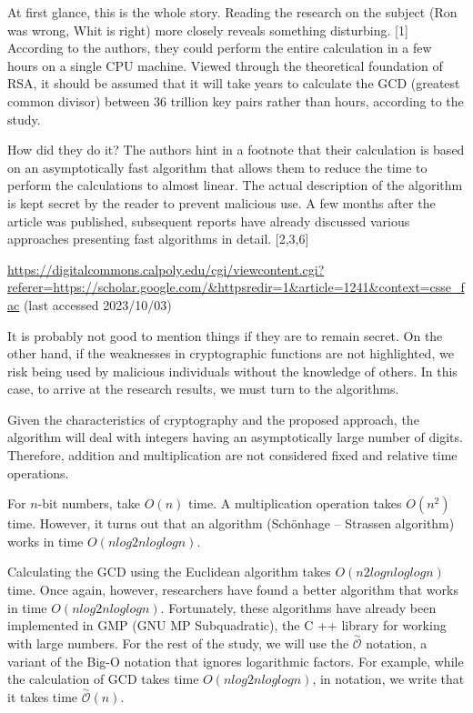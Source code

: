 \documentclass[runningheads]{llncs}
\begin{document}
At first glance, this is the whole story. Reading the research on the subject (Ron was wrong, Whit is right) more closely reveals something disturbing. [1] According to the authors, they could perform the entire calculation in a few hours on a single CPU machine. Viewed through the theoretical foundation of RSA, it should be assumed that it will take years to calculate the GCD (greatest common divisor) between 36 trillion key pairs rather than hours, according to the study.

How did they do it? The authors hint in a footnote that their calculation is based on an asymptotically fast algorithm that allows them to reduce the time to perform the calculations to almost linear. The actual description of the algorithm is kept secret by the reader to prevent malicious use. A few months after the article was published, subsequent reports have already discussed various approaches presenting fast algorithms in detail. [2,3,6] 

\url{https://digitalcommons.calpoly.edu/cgi/viewcontent.cgi?referer=https://scholar.google.com/&httpsredir=1&article=1241&context=csse_fac} (last accessed 2023/10/03)

It is probably not good to mention things if they are to remain secret. On the other hand, if the weaknesses in cryptographic functions are not highlighted, we risk being used by malicious individuals without the knowledge of others. In this case, to arrive at the research results, we must turn to the algorithms. 

Given the characteristics of cryptography and the proposed approach, the algorithm will deal with integers having an asymptotically large number of digits. Therefore, addition and multiplication are not considered fixed and relative time operations.

For $n$-bit numbers, take $O(n)$ time. A multiplication operation takes $O(n^2)$ time. However, it turns out that an algorithm (Schönhage – Strassen algorithm) works in time $O(n log 2 n log log n)$.

Calculating the GCD using the Euclidean algorithm takes $O(n2 log n log log n)$ time. Once again, however, researchers have found a better algorithm that works in time $O (n log 2 n log log n)$. Fortunately, these algorithms have already been implemented in GMP (GNU MP Subquadratic), the C ++ library for working with large numbers. For the rest of the study, we will use the $\overset{\sim}{\mathcal{O}}$ notation, a variant of the Big-O notation that ignores logarithmic factors. For example, while the calculation of GCD takes time $O (n log 2 n log log n)$, in notation, we write that it takes time $\overset{\sim}{\mathcal{O}}(n)$.
\end{document}
